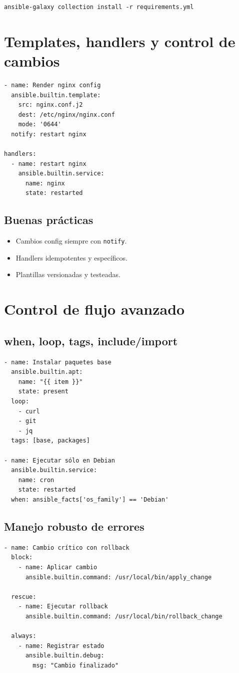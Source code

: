 \documentclass[12pt,a4paper]{article}
\begin{document}
\begin{lstlisting}[caption=Instalar colecciones]
ansible-galaxy collection install -r requirements.yml
\end{lstlisting}

\section{Templates, handlers y control de cambios}

\begin{lstlisting}[caption=Template + notify handler]
- name: Render nginx config
  ansible.builtin.template:
    src: nginx.conf.j2
    dest: /etc/nginx/nginx.conf
    mode: '0644'
  notify: restart nginx

handlers:
  - name: restart nginx
    ansible.builtin.service:
      name: nginx
      state: restarted
\end{lstlisting}

\subsection{Buenas prácticas}
\begin{itemize}
  \item Cambios config siempre con \texttt{notify}.
  \item Handlers idempotentes y específicos.
  \item Plantillas versionadas y testeadas.
\end{itemize}

\section{Control de flujo avanzado}

\subsection{when, loop, tags, include/import}
\begin{lstlisting}[caption=Flujo avanzado]
- name: Instalar paquetes base
  ansible.builtin.apt:
    name: "{{ item }}"
    state: present
  loop:
    - curl
    - git
    - jq
  tags: [base, packages]

- name: Ejecutar sólo en Debian
  ansible.builtin.service:
    name: cron
    state: restarted
  when: ansible_facts['os_family'] == 'Debian'
\end{lstlisting}

\subsection{Manejo robusto de errores}
\begin{lstlisting}[caption=block/rescue/always]
- name: Cambio crítico con rollback
  block:
    - name: Aplicar cambio
      ansible.builtin.command: /usr/local/bin/apply_change

  rescue:
    - name: Ejecutar rollback
      ansible.builtin.command: /usr/local/bin/rollback_change

  always:
    - name: Registrar estado
      ansible.builtin.debug:
        msg: "Cambio finalizado"
\end{lstlisting}
\end{document}
